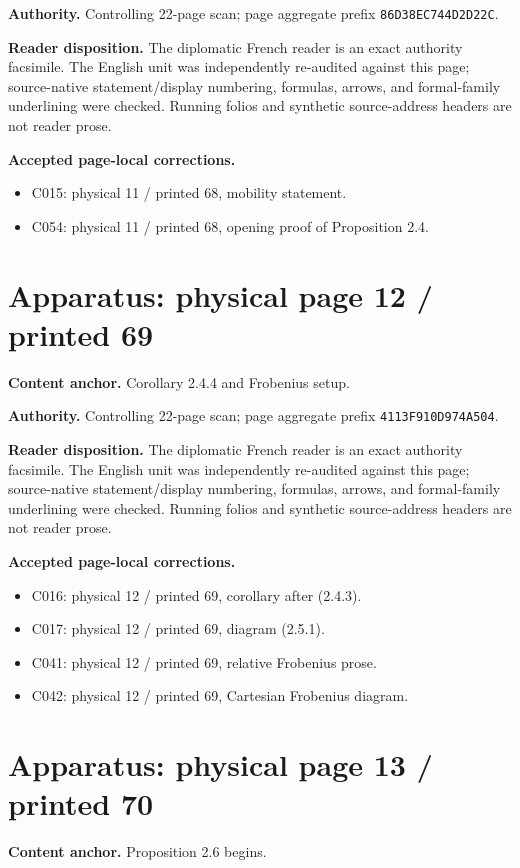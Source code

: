 \documentclass[10pt]{article}
\begin{document}
\textbf{Authority.} Controlling 22-page scan; page aggregate prefix \texttt{86D38EC744D2D22C}.

\textbf{Reader disposition.} The diplomatic French reader is an exact authority facsimile. The English unit was independently re-audited against this page; source-native statement/display numbering, formulas, arrows, and formal-family underlining were checked. Running folios and synthetic source-address headers are not reader prose.

\textbf{Accepted page-local corrections.} \begin{itemize}
\item C015: physical 11 / printed 68, mobility statement.
\item C054: physical 11 / printed 68, opening proof of Proposition 2.4.
\end{itemize}
\newpage
\setcounter{footnote}{0}
\fontsize{10.2pt}{12.04pt}\selectfont
\section*{Apparatus: physical page 12 / printed 69}
\textbf{Content anchor.} Corollary 2.4.4 and Frobenius setup.

\textbf{Authority.} Controlling 22-page scan; page aggregate prefix \texttt{4113F910D974A504}.

\textbf{Reader disposition.} The diplomatic French reader is an exact authority facsimile. The English unit was independently re-audited against this page; source-native statement/display numbering, formulas, arrows, and formal-family underlining were checked. Running folios and synthetic source-address headers are not reader prose.

\textbf{Accepted page-local corrections.} \begin{itemize}
\item C016: physical 12 / printed 69, corollary after (2.4.3).
\item C017: physical 12 / printed 69, diagram (2.5.1).
\item C041: physical 12 / printed 69, relative Frobenius prose.
\item C042: physical 12 / printed 69, Cartesian Frobenius diagram.
\end{itemize}
\newpage
\setcounter{footnote}{0}
\fontsize{10.2pt}{12.04pt}\selectfont
\section*{Apparatus: physical page 13 / printed 70}
\textbf{Content anchor.} Proposition 2.6 begins.
\end{document}
